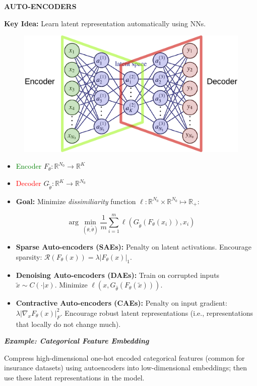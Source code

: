 \documentclass[a4paper,10pt]{article}
\def\R{\mathbb{R}}
\newcommand{\subtitle}[1]{\vspace{0.25cm}\begin{normalsize}\textbf{\textcolor{gray!150}{\uppercase{#1}}}\end{normalsize}}
\begin{document}
\begin{small}
\subtitle{Auto-encoders}

\textbf{Key Idea:} Learn latent representation automatically using NNs.
\begin{figure}
    \centering
    \vspace{-15pt}
    \includegraphics[width=0.45\columnwidth]{figures/Autoencoder.png}
    \vspace{-40pt}
\end{figure}
\begin{itemize}
    \item \textcolor{green}{Encoder} $F_\theta : \mathbb{R}^{N_0} \to \mathbb{R}^K$
    \item \textcolor{red}{Decoder} $G_{\tilde{\theta}} : \mathbb{R}^K \to \mathbb{R}^{N_0}$
    \item \textbf{Goal:} Minimize \textit{dissimiliarity} function $\ell: \mathbb{R}^{N_0} \times \mathbb{R}^{N_0} \mapsto \R_+$: 
\end{itemize}
$$
\arg \min_{(\theta, \tilde{\theta})} \frac{1}{m} \sum_{i=1}^m \ell(G_{\tilde{\theta}}(F_\theta(x_i)), x_i)
$$

\begin{itemize}
    \item \textbf{Sparse Auto-encoders (SAEs):} Penalty on latent activations. Encourage sparsity: $\mathcal{R}(F_{\theta}(x)) = \lambda |F_{\theta}(x)|_1$.
    \item \textbf{Denoising Auto-encoders (DAEs):} Train on corrupted inputs $\tilde{x} \sim C(\cdot | x)$. Minimize $\ell(x, G_{\hat{\theta}}(F_{\theta}(\tilde{x})))$. 
    \item \textbf{Contractive Auto-encoders (CAEs):} Penalty on input gradient: $\lambda |\nabla_x F_{\theta}(x)|_F^2$. Encourage robust latent representations (i.e., representations that locally do not change much).
\end{itemize}

\textit{\textbf{Example: Categorical Feature Embedding}}

Compress high-dimensional one-hot encoded categorical features (common for insurance datasets) using autoencoders into low-dimensional embeddings; then use these latent representations in the model.



\end{small}
\end{document}
